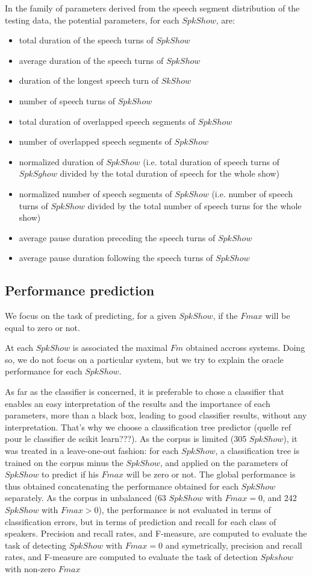 In the family of parameters derived from the speech segment distribution of the testing data, the potential parameters, for each $SpkShow$, are:
\begin{itemize}
\item total duration of the speech turns of $SpkShow$
\item average duration of the speech turns of $SpkShow$
\item duration of the longest speech turn of $SkShow$
\item number of speech turns of $SpkShow$
\item total duration of overlapped speech segments of $SpkShow$
\item number of overlapped speech segments of $SpkShow$
\item normalized duration of $SpkShow$ (i.e. total duration of speech turns of $SpkSghow$ divided by the total duration of speech for the whole show)
\item normalized number of speech segments of $SpkShow$ (i.e.   number of speech turns of $SpkShow$ divided by the total number of speech turns for the whole show) 
\item average pause duration preceding the speech turns of $SpkShow$
\item average pause duration following the speech turns of $SpkShow$
\end{itemize}

\subsection{Performance prediction}


We focus on the task of predicting, for a given $SpkShow$, if the $Fmax$ will be equal to zero or not.

At each $SpkShow$ is associated the maximal $Fm$ obtained accross systems. Doing so, we do not focus on a particular system, but we try to explain the oracle performance for each $SpkShow$.

As far as the classifier is concerned, it is preferable to chose a classifier that enables an easy interpretation of the results and the importance of each parameters, more than a black box, leading to good classifier results, without any interpretation. That's why we choose a classification tree predictor (quelle ref pour le classifier de scikit learn???).
As the corpus is limited (305 $SpkShow$), it was treated in a leave-one-out fashion: for each $SpkShow$, a classification tree is trained on the corpus minus the $SpkShow$, and applied on the parameters of $SpkShow$ to predict if his $Fmax$ will be zero or not. The global performance is thus obtained concatenating the performance obtained for each $SpkShow$ separately.
As the corpus in unbalanced (63 $SpkShow$ with $Fmax=0$, and 242 $SpkShow$ with $Fmax>0$), the performance is not evaluated in terms of classification errors, but in terms of prediction and recall for each class of speakers. Precision and recall rates, and F-measure,  are computed to evaluate the task of detecting $SpkShow$ with $Fmax=0$ and symetrically, precision and recall rates, and F-measure are computed to evaluate the task of detection $Spkshow$ with non-zero $Fmax$

